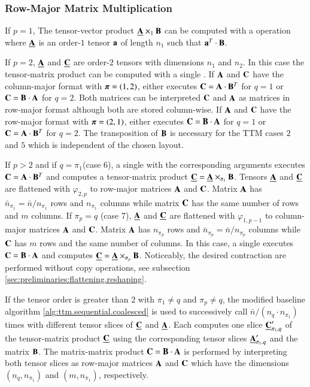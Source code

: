 \subsubsection{Row-Major Matrix Multiplication}

If $p=1$, The tensor-vector product $\underline{\mathbf{A}} \times_1 \mathbf{B}$ can be computed with a  operation where $\underline{\mathbf{A}}$ is an order-$1$ tensor $\mathbf{a}$ of length $n_1$ such that $\mathbf{a}^T \cdot \mathbf{B}$.

If $p=2$, $\underline{\mathbf{A}}$ and $\underline{\mathbf{C}}$ are order-$2$ tensors with dimensions $n_1$ and $n_2$.
In this case the tensor-matrix product can be computed with a single .
If $\mathbf{A}$ and $\mathbf{C}$ have the column-major format with $\boldsymbol{\pi}=(1,2)$,  either executes $\mathbf{C} = \mathbf{A} \cdot \mathbf{B}^T$ for $q =1$ or $\mathbf{C} = \mathbf{B} \cdot \mathbf{A}$ for $q=2$.
Both matrices can be interpreted $\mathbf{C}$ and $\mathbf{A}$ as matrices in row-major format although both are stored column-wise.
If $\mathbf{A}$ and $\mathbf{C}$ have the row-major format with $\boldsymbol{\pi}=(2,1)$,  either executes $\mathbf{C} = \mathbf{B} \cdot \mathbf{A}$ for $q =1$ or $\mathbf{C} = \mathbf{A} \cdot \mathbf{B}^T$ for $q=2$. 
The transposition of $\mathbf{B}$ is necessary for the TTM cases $2$ and $5$ which is independent of the chosen layout.

If $p>2$ and if $q=\pi_1$(case 6), a single  with the corresponding arguments executes $\mathbf{C} = \mathbf{A} \cdot \mathbf{B}^T$ and computes a tensor-matrix product $\underline{\mathbf{C}} = \underline{\mathbf{A}} \times_{\pi_1} \mathbf{B}$.
Tensors $\underline{\mathbf{A}}$ and $\underline{\mathbf{C}}$ are flattened with $\varphi_{2,p}$ to row-major matrices $\mathbf{A}$ and $\mathbf{C}$.
Matrix $\mathbf{A}$ has $\bar{n}_{\pi_1} = \bar{n} / n_{\pi_1}$ rows and $n_{\pi_1}$ columns while matrix $\mathbf{C}$ has the same number of rows and $m$ columns.
If $\pi_p=q$ (case 7), $\underline{\mathbf{A}}$ and $\underline{\mathbf{C}}$ are flattened with $\varphi_{1,p-1}$ to column-major matrices $\mathbf{A}$ and $\mathbf{C}$.
Matrix $\mathbf{A}$ has $n_{\pi_p}$ rows and $\bar{n}_{\pi_p} =  \bar{n} / n_{\pi_p}$ columns while $\mathbf{C}$ has $m$ rows and the same number of columns.
In this case, a single  executes $\mathbf{C} = \mathbf{B} \cdot \mathbf{A}$ and computes $\underline{\mathbf{C}} = \underline{\mathbf{A}} \times_{\pi_p} \mathbf{B}$.
Noticeably, the desired contraction are performed without copy operations, see subsection \ref{sec:preliminaries:flattening.reshaping}. 

If the tensor order is greater than $2$ with $\pi_1\neq q$ and $\pi_p \neq q$, the modified baseline algorithm \ref{alg:ttm.sequential.coalesced} is used to successively call $\bar{n} / (n_q \cdot n_{\pi_1})$ times  with different tensor slices of $\underline{\mathbf{C}}$ and $\underline{\mathbf{A}}$.
Each  computes one slice $\underline{\mathbf{C}}_{\pi_1,q}'$ of the tensor-matrix product $\underline{\mathbf{C}}$ using the corresponding tensor slices $\underline{\mathbf{A}}_{\pi_1,q}'$ and the matrix $\mathbf{B}$.
The matrix-matrix product $\mathbf{C} = \mathbf{B} \cdot \mathbf{A}$ is performed by interpreting both tensor slices as row-major matrices $\mathbf{A}$ and $\mathbf{C}$ which have the dimensions $(n_q,n_{\pi_1})$ and $(m,n_{\pi_1})$, respectively.

